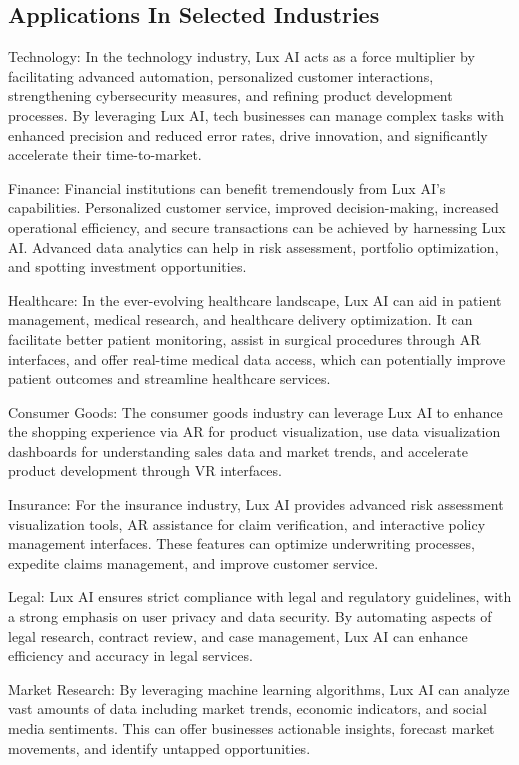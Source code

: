 \documentclass[11pt]{article}
\begin{document}
\subsection{Applications In Selected Industries}

Technology: In the technology industry, Lux AI acts as a force multiplier by facilitating advanced automation, personalized customer interactions, strengthening cybersecurity measures, and refining product development processes. By leveraging Lux AI, tech businesses can manage complex tasks with enhanced precision and reduced error rates, drive innovation, and significantly accelerate their time-to-market.


Finance: Financial institutions can benefit tremendously from Lux AI's capabilities. Personalized customer service, improved decision-making, increased operational efficiency, and secure transactions can be achieved by harnessing Lux AI. Advanced data analytics can help in risk assessment, portfolio optimization, and spotting investment opportunities.


Healthcare: In the ever-evolving healthcare landscape, Lux AI can aid in patient management, medical research, and healthcare delivery optimization. It can facilitate better patient monitoring, assist in surgical procedures through AR interfaces, and offer real-time medical data access, which can potentially improve patient outcomes and streamline healthcare services.


Consumer Goods: The consumer goods industry can leverage Lux AI to enhance the shopping experience via AR for product visualization, use data visualization dashboards for understanding sales data and market trends, and accelerate product development through VR interfaces.


Insurance: For the insurance industry, Lux AI provides advanced risk assessment visualization tools, AR assistance for claim verification, and interactive policy management interfaces. These features can optimize underwriting processes, expedite claims management, and improve customer service.


Legal: Lux AI ensures strict compliance with legal and regulatory guidelines, with a strong emphasis on user privacy and data security. By automating aspects of legal research, contract review, and case management, Lux AI can enhance efficiency and accuracy in legal services.


Market Research: By leveraging machine learning algorithms, Lux AI can analyze vast amounts of data including market trends, economic indicators, and social media sentiments. This can offer businesses actionable insights, forecast market movements, and identify untapped opportunities.
\end{document}
